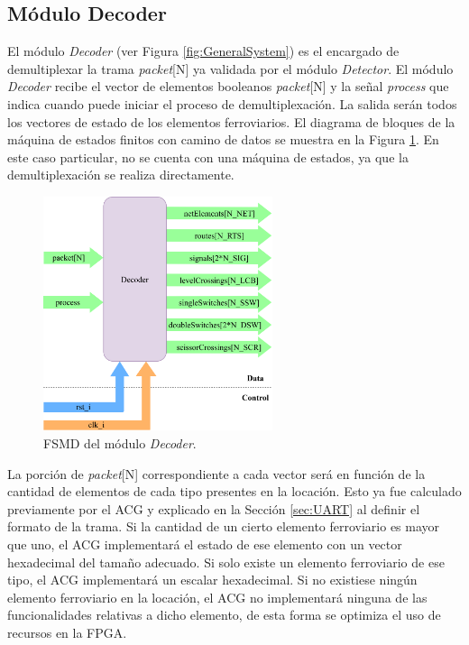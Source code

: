 \subsection{Módulo Decoder}
	\label{sec:decoder}
	
	El módulo \textit{Decoder} (ver Figura \ref{fig:GeneralSystem}) es el encargado de demultiplexar la trama \textit{packet}[N] ya validada por el módulo \textit{Detector}. El módulo \textit{Decoder} recibe el vector de elementos booleanos \textit{packet}[N] y la señal \textit{process} que indica cuando puede iniciar el proceso de demultiplexación. La salida serán todos los vectores de estado de los elementos ferroviarios. El diagrama de bloques de la máquina de estados finitos con camino de datos se muestra en la Figura \ref{fig:Decoder_module}. En este caso particular, no se cuenta con una máquina de estados, ya que la demultiplexación se realiza directamente.
	
	\begin{figure}[H]
		\centering
		\includegraphics[width=0.6\textwidth]{Figuras/Decoder_module.png}
		\centering\caption{FSMD del módulo \textit{Decoder}.}
		\label{fig:Decoder_module}
	\end{figure}
	
	 La porción de \textit{packet}[N] correspondiente a cada vector será en función de la cantidad de elementos de cada tipo presentes en la locación. Esto ya fue calculado previamente por el ACG y explicado en la Sección \ref{sec:UART} al definir el formato de la trama. Si la cantidad de un cierto elemento ferroviario es mayor que uno, el ACG implementará el estado de ese elemento con un vector hexadecimal del tamaño adecuado. Si solo existe un elemento ferroviario de ese tipo, el ACG implementará un escalar hexadecimal. Si no existiese ningún elemento ferroviario en la locación, el ACG no implementará ninguna de las funcionalidades relativas a dicho elemento, de esta forma se optimiza el uso de recursos en la FPGA.